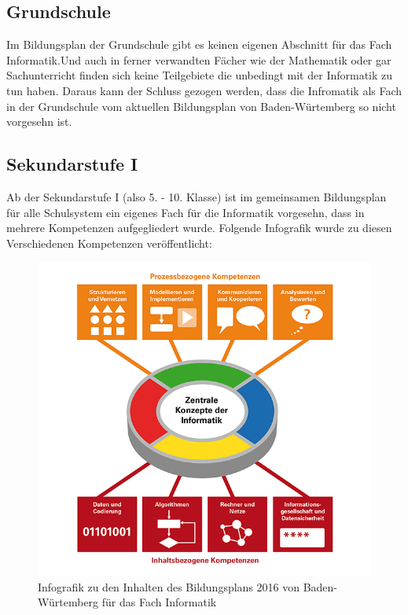 \subsection{Grundschule}
Im Bildungsplan der Grundschule gibt es keinen eigenen Abschnitt für das Fach Informatik\cite{Fachuebersicht}.Und auch in ferner verwandten Fächer wie der Mathematik\cite{Mathematik} oder gar Sachunterricht\cite{Sachunterricht}  finden sich keine Teilgebiete die unbedingt mit der Informatik zu tun haben. Daraus kann der Schluss gezogen werden, dass die Infromatik als Fach in der Grundschule vom aktuellen Bildungsplan von Baden-Würtemberg so nicht vorgesehn ist.

\subsection{Sekundarstufe I}
Ab der Sekundarstufe I (also 5. - 10. Klasse) ist im gemeinsamen Bildungsplan für alle Schulsystem ein eigenes Fach für die Informatik vorgesehn, dass in mehrere Kompetenzen aufgegliedert wurde\cite{Informatik}. Folgende Infografik wurde zu diesen Verschiedenen Kompetenzen veröffentlicht:

\begin{figure}[ht]
	\centering
	\includegraphics[width=\textwidth,height=\textheight,keepaspectratio]{images/BildungsplanInformatik.png}
	\caption{Infografik zu den Inhalten des Bildungsplans 2016 von Baden-Würtemberg für das Fach Informatik}
	\label{Bildungsplan Infromatik Infografik}
\end{figure}

